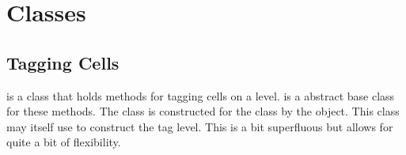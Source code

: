 

\def\havefulldoc{1}






\section{Classes}

\subsection{Tagging Cells}

 is a class that holds methods for tagging cells on a level.
 is a abstract base class for these methods.
The  class is constructed for the  class by the  object.
This class may itself use  to construct the tag level.
This is a bit superfluous but allows for quite a bit of flexibility.

